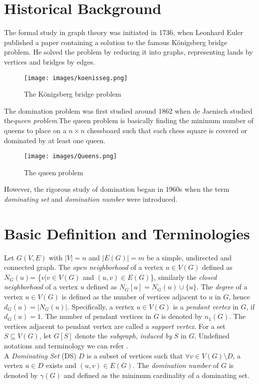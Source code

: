 \section{Historical Background} 
The formal study in graph theory was initiated in 1736, when Leonhard Euler published a paper containing a solution to the famous K{\"{o}}nigsberg bridge problem. He solved the problem by reducing it into graphs, representing lands by vertices and bridges by edges.
\begin{figure}[H]
\centering
\texttt{[image: images/koenisseg.png]}
\caption{The K{\"{o}}nigsberg bridge problem}
\end{figure}
The domination problem was first studied around 1862 when de Jaenisch studied the\textit{queen problem}.The queen problem is basically finding the minimum number of queens to place on a $n \times n$ chessboard such that each chess square is covered or dominated by at least one queen.
 \begin{figure}[H]
	\centering
	\texttt{[image: images/Queens.png]}
	\caption{The queen problem}
\end{figure}
However, the rigorous study of domination began in 1960s when the term \textit{dominating set} and \textit{domination number} were introduced.

\section{Basic Definition and Terminologies}
\noindent  
Let $G(V,E)$ with $|V|=n$ and $|E(G)|=m$ be a simple, undirected and connected graph. The \textit{open neighborhood} of a vertex $u \in V(G)$ defined as $N_G(u)$= \{$v  | v \in V(G)$ and $(u,v) \in E(G)$\}, similarly the \textit{closed neighborhood} of a vertex $u$ defined as $N_G[u]=N_G(u) \cup \{u\}$. The \textit {degree} of a vertex $u \in V(G)$ is defined as the number of vertices adjacent to $u$ in $G$, hence $d_G(u) = |N_G(u)|$. Specifically, a vertex $u \in V(G)$ is a \textit{pendant vertex} in $G$, if $d_G(u)=1$. The number of pendant vertices in $G$ is denoted by $n_1(G)$. The vertices adjacent to pendant vertex are called a \textit{support vertex}. For a set $S \subseteq V(G)$, let $G[S]$ denote the \textit{subgraph}, \textit{induced by} $S$ in  $G$. Undefined notations and terminology we can refer  \cite{Chartrand,West}.\\
\noindent
A \textit{Dominating Set} (DS) $D$ is a subset of vertices such that  $\forall v \in V(G) \setminus D$, a vertex $u \in D$ exists and $(u,v)\in E(G)$. The \textit{domination number} of $G$ is denoted by $\gamma(G)$ and defined as the minimum cardinality of a dominating set.\\ 

